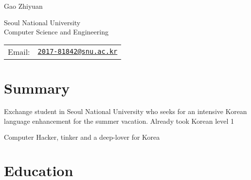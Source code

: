 \documentclass[letterpaper]{article}
\def\name{Gao Zhiyuan}
\renewenvironment{itemize}{
  \begin{list}{}{
    \setlength{\leftmargin}{1.5em}
  }
}{
  \end{list}
}
\begin{document}
{\huge \name}


\vspace{0.25in}

\begin{minipage}{0.45\linewidth}
  Seoul National University \\
  Computer Science and Engineering \\
\end{minipage}
\begin{minipage}{0.45\linewidth}
  \begin{tabular}{ll}
    Email: & \href{mailto:2017-81842@snu.ac.kr}{\tt 2017-81842@snu.ac.kr} \\
  \end{tabular}
\end{minipage}


%
\section*{Summary}
\begin{itemize}
	\item Exchange student in Seoul National University who seeks for an intensive Korean language enhancement for the summer vacation. Already took Korean level 1
	\item Computer Hacker, tinker and a deep-lover for Korea
\end{itemize}

\section*{Education}
\end{document}
